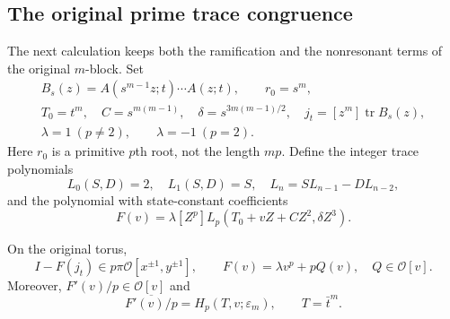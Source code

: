 \subsection{The original prime trace congruence}

The next calculation keeps both the ramification and the nonresonant
terms of the original $m$-block. Set
\[
 \begin{gathered}
 B_s(z)=A(s^{m-1}z;t)\cdots A(z;t),\qquad r_0=s^m,\\
 T_0=t^m,\quad C=s^{m(m-1)},\quad
 \delta=s^{3m(m-1)/2},\quad j_t=[z^m]\operatorname{tr}B_s(z),\\
 \lambda=1\ (p\ne2),\qquad \lambda=-1\ (p=2).
 \end{gathered}
\]
Here $r_0$ is a primitive $p$th root, not the length $mp$.
Define the integer trace polynomials
\[
 L_0(S,D)=2,\quad L_1(S,D)=S,\quad
 L_n=SL_{n-1}-DL_{n-2},
\]
and the polynomial with state-constant coefficients
\begin{equation}
 F(v)=\lambda[Z^p]L_p(T_0+vZ+CZ^2,\delta Z^3).
 \label{first:F}
\end{equation}

\begin{lemma}
\label{first:prime-congruence}
On the original torus,
\begin{equation}
 I-F(j_t)\in p\pi\mathcal O[x^{\pm1},y^{\pm1}],\qquad
 F(v)=\lambda v^p+pQ(v),\quad Q\in\mathcal O[v].
 \label{first:congruence}
\end{equation}
Moreover, $F'(v)/p\in\mathcal O[v]$ and
\begin{equation}
 \overline{F'(v)/p}=H_p(T,v;\varepsilon_m),\qquad T=\bar t^m.
 \label{first:F-derivative}
\end{equation}
\end{lemma}

